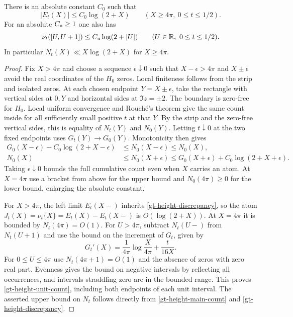 \begin{lemma}
\label{gt-height-count}
There is an absolute constant \(C_0\) such that
\begin{equation}
 |E_t(X)|\le C_0\log(2+X)\qquad (X\ge4\pi,\ 0\le t\le1/2).
 \label{gt-height-discrepancy}
\end{equation}
For an absolute \(C_{\rm u}\ge1\) one also has
\begin{equation}
 \nu_t([U,U+1])\le C_{\rm u}\log(2+|U|)
 \qquad(U\in\mathbb R,\ 0\le t\le1/2).
 \label{gt-height-unit-count}
\end{equation}
In particular \(N_t(X)\ll X\log(2+X)\) for \(X\ge4\pi\).
\end{lemma}
\begin{proof}
Fix \(X>4\pi\) and choose a sequence \(\epsilon\downarrow0\) such that
\(X-\epsilon>4\pi\) and \(X\pm\epsilon\) avoid the real coordinates
of the \(H_0\) zeros. Local finiteness follows from the strip and
isolated zeros. At each chosen endpoint \(Y=X\pm\epsilon\), take
the rectangle with vertical sides at \(0,Y\) and horizontal sides
at \(\Im z=\pm2\). The boundary is zero-free for \(H_0\). Local
uniform convergence and Rouch\'e's theorem give the same count
inside for all sufficiently small positive \(t\) at that \(Y\).
By the strip and the zero-free vertical sides, this is equality
of \(N_t(Y)\) and \(N_0(Y)\). Letting \(t\downarrow0\) at the two
fixed endpoints uses \(G_t(Y)\to G_0(Y)\). Monotonicity then gives
\[
 \begin{aligned}
 G_0(X-\epsilon)-C_0\log(2+X-\epsilon)
 &\le N_0(X-\epsilon)\le N_0(X),\\
 N_0(X)&\le N_0(X+\epsilon)
    \le G_0(X+\epsilon)+C_0\log(2+X+\epsilon).
 \end{aligned}
\]
Taking \(\epsilon\downarrow0\) bounds the full cumulative count even
when \(X\) carries an atom. At \(X=4\pi\) use a bracket from above
for the upper bound and \(N_0(4\pi)\ge0\) for the lower bound,
enlarging the absolute constant.

For \(X>4\pi\), the left limit \(E_t(X-)\) inherits
\eqref{gt-height-discrepancy}, so the atom
\(J_t(X)=\nu_t\{X\}=E_t(X)-E_t(X-)\) is \(O(\log(2+X))\).
At \(X=4\pi\) it is bounded by \(N_t(4\pi)=O(1)\).
For \(U>4\pi\), subtract \(N_t(U-)\) from \(N_t(U+1)\) and use
the bound on the increment of \(G_t\), given by
\[
 G_t'(X)=\frac{1}{4\pi}\log\frac{X}{4\pi}+\frac{t}{16X}.
\]
For \(0\le U\le4\pi\) use \(N_t(4\pi+1)=O(1)\) and the absence
of zeros with zero real part. Evenness gives the bound on negative
intervals by reflecting all occurrences, and intervals straddling
zero are in the bounded range. This proves \eqref{gt-height-unit-count},
including both endpoints of each unit interval. The asserted upper
bound on \(N_t\) follows directly from \eqref{gt-height-main-count}
and \eqref{gt-height-discrepancy}.
\end{proof}


